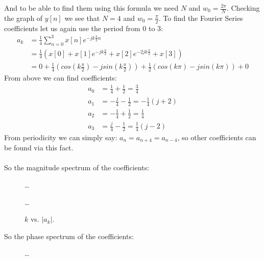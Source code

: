 \documentclass[10pt,a4paper, margin=1in]{article}
\begin{document}
\begin{enumerate}
\begin{enumerate}
\begin{enumerate}
			And to be able to find them using this formula we need $N$ and $w_0=\frac{2\pi}{N}$. Checking the graph of $y[n]$ we see that $N=4$ and $w_0=\frac{\pi}{2}$. To find the Fourier Series coefficients let us again use the period from 0 to 3:
			\begin{align*}
			a_k &= \frac{1}{4}\sum_{n=0}^{3} x[n]e^{-jk\frac{\pi}{2}n} \\
				&= \frac{1}{4}(x[0] + x[1]e^{-jk\frac{\pi}{2}} + x[2]e^{-2jk\frac{\pi}{2}} + x[3]) \\
				&= 0 + \frac{1}{4}(cos(k\frac{\pi}{2}) - jsin(k\frac{\pi}{2})) + \frac{1}{2}(cos(k\pi) - jsin(k\pi)) + 0
			\end{align*}
			From above we can find coefficients:
			\begin{align*}
			a_0 &= \frac{1}{4} + \frac{1}{2} = \frac{3}{4} \\
			a_1 &= -\frac{j}{4} - \frac{1}{2} = -\frac{1}{4}(j+2) \\
			a_2 &= -\frac{1}{4} + \frac{1}{2} = \frac{1}{4} \\
			a_3 &= \frac{j}{4} - \frac{1}{2} = \frac{1}{4}(j-2) 		
			\end{align*}
			From periodicity we can simply say: $a_n = a_{n+4} = a_{n-4}$, so other coefficients can be found via this fact. \\\\
			So the magnitude spectrum of the coefficients: 
\begin{figure}[H]
    \centering
    \ldots
    \ldots
    \caption{$k$ vs. $|a_k|$.}
    \label{fig:q1_b1}
\end{figure}
			So the phase spectrum of the coefficients: 
\begin{figure}[H]
    \centering
    \ldots
    \begin{tikzpicture}[scale=1.0] 

\end{tikzpicture}
\end{figure}
\end{enumerate}
\end{enumerate}
\end{enumerate}
\end{document}
